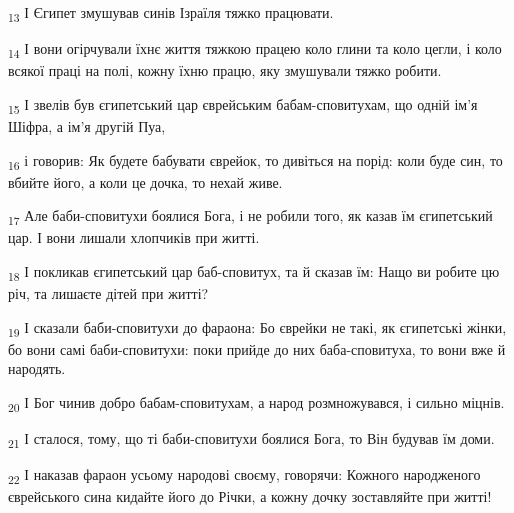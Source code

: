 \begin{tcolorbox}
\textsubscript{13} І Єгипет змушував синів Ізраїля тяжко працювати.
\end{tcolorbox}
\begin{tcolorbox}
\textsubscript{14} І вони огірчували їхнє життя тяжкою працею коло глини та коло цегли, і коло всякої праці на полі, кожну їхню працю, яку змушували тяжко робити.
\end{tcolorbox}
\begin{tcolorbox}
\textsubscript{15} І звелів був єгипетський цар єврейським бабам-сповитухам, що одній ім'я Шіфра, а ім'я другій Пуа,
\end{tcolorbox}
\begin{tcolorbox}
\textsubscript{16} і говорив: Як будете бабувати єврейок, то дивіться на порід: коли буде син, то вбийте його, а коли це дочка, то нехай живе.
\end{tcolorbox}
\begin{tcolorbox}
\textsubscript{17} Але баби-сповитухи боялися Бога, і не робили того, як казав їм єгипетський цар. І вони лишали хлопчиків при житті.
\end{tcolorbox}
\begin{tcolorbox}
\textsubscript{18} І покликав єгипетський цар баб-сповитух, та й сказав їм: Нащо ви робите цю річ, та лишаєте дітей при житті?
\end{tcolorbox}
\begin{tcolorbox}
\textsubscript{19} І сказали баби-сповитухи до фараона: Бо єврейки не такі, як єгипетські жінки, бо вони самі баби-сповитухи: поки прийде до них баба-сповитуха, то вони вже й народять.
\end{tcolorbox}
\begin{tcolorbox}
\textsubscript{20} І Бог чинив добро бабам-сповитухам, а народ розмножувався, і сильно міцнів.
\end{tcolorbox}
\begin{tcolorbox}
\textsubscript{21} І сталося, тому, що ті баби-сповитухи боялися Бога, то Він будував їм доми.
\end{tcolorbox}
\begin{tcolorbox}
\textsubscript{22} І наказав фараон усьому народові своєму, говорячи: Кожного народженого єврейського сина кидайте його до Річки, а кожну дочку зоставляйте при житті!
\end{tcolorbox}
